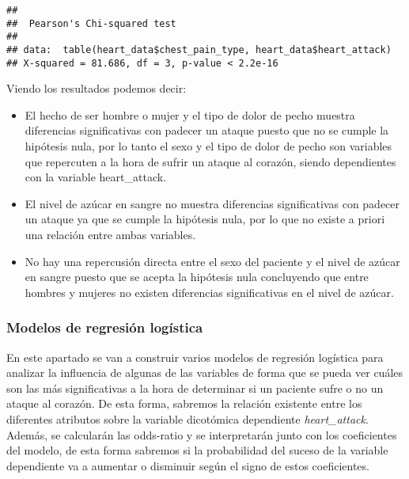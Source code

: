 \documentclass[
]{article}
\newenvironment{Shaded}{\begin{snugshade}}{\end{snugshade}}
\newcommand{\FunctionTok}[1]{\textcolor[rgb]{0.00,0.00,0.00}{#1}}
\newcommand{\NormalTok}[1]{#1}
\newcommand{\SpecialCharTok}[1]{\textcolor[rgb]{0.00,0.00,0.00}{#1}}
\begin{document}
\begin{Shaded}
\end{Shaded}

\begin{verbatim}
## 
##  Pearson's Chi-squared test
## 
## data:  table(heart_data$chest_pain_type, heart_data$heart_attack)
## X-squared = 81.686, df = 3, p-value < 2.2e-16
\end{verbatim}

Viendo los resultados podemos decir:

\begin{itemize}
\item
  El hecho de ser hombre o mujer y el tipo de dolor de pecho muestra
  diferencias significativas con padecer un ataque puesto que no se
  cumple la hipótesis nula, por lo tanto el sexo y el tipo de dolor de
  pecho son variables que repercuten a la hora de sufrir un ataque al
  corazón, siendo dependientes con la variable heart\_attack.
\item
  El nivel de azúcar en sangre no muestra diferencias significativas con
  padecer un ataque ya que se cumple la hipótesis nula, por lo que no
  existe a priori una relación entre ambas variables.
\item
  No hay una repercusión directa entre el sexo del paciente y el nivel
  de azúcar en sangre puesto que se acepta la hipótesis nula concluyendo
  que entre hombres y mujeres no existen diferencias significativas en
  el nivel de azúcar.
\end{itemize}

\hypertarget{modelos-de-regresiuxf3n-loguxedstica}{%
\subsubsection{Modelos de regresión
logística}\label{modelos-de-regresiuxf3n-loguxedstica}}

En este apartado se van a construir varios modelos de regresión
logística para analizar la influencia de algunas de las variables de
forma que se pueda ver cuáles son las más significativas a la hora de
determinar si un paciente sufre o no un ataque al corazón. De esta
forma, sabremos la relación existente entre los diferentes atributos
sobre la variable dicotómica dependiente \emph{heart\_attack}. Además,
se calcularán las odds-ratio y se interpretarán junto con los
coeficientes del modelo, de esta forma sabremos si la probabilidad del
suceso de la variable dependiente va a aumentar o disminuir según el
signo de estos coeficientes.
\end{document}
